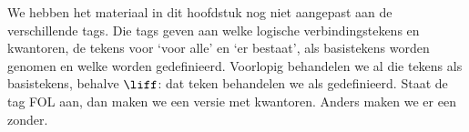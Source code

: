 \documentclass[../../../include/open-logic-chapter]{subfiles}
\begin{document}
      {}
      {}

\begin{editorial}
  We hebben het materiaal in dit hoofdstuk nog niet aangepast aan de
  verschillende tags. Die tags geven aan welke logische verbindingstekens
  en kwantoren, de tekens voor `voor alle' en `er bestaat', als basistekens
  worden genomen en welke worden gedefinieerd. Voorlopig behandelen we al
  die tekens als basistekens, behalve $\liff$: dat teken behandelen we als
  gedefinieerd. Staat de tag FOL aan, dan maken we een versie met
  kwantoren. Anders maken we er een zonder.
\end{editorial}














\OLEndChapterHook
\end{document}

